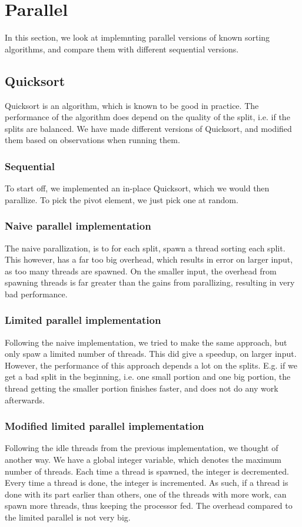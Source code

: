 \section{Parallel}
In this section, we look at implemnting parallel versions of known sorting
algorithms, and compare them with different sequential versions.

\subsection{Quicksort}
Quicksort is an algorithm, which is known to be good in practice. The
performance of the algorithm does depend on the quality of the split, i.e. if
the splits are balanced. We have made different versions of Quicksort, and
modified them based on observations when running them.

\subsubsection{Sequential}
To start off, we implemented an in-place Quicksort, which we would then
parallize. To pick the pivot element, we just pick one at random.

\subsubsection{Naive parallel implementation}
The naive parallization, is to for each split, spawn a thread sorting each
split. This however, has a far too big overhead, which results in error on
larger input, as too many threads are spawned. On the smaller input, the
overhead from spawning threads is far greater than the gains from parallizing,
resulting in very bad performance.

\subsubsection{Limited parallel implementation}
Following the naive implementation, we tried to make the same approach, but
only spaw a limited number of threads. This did give a speedup, on larger
input. However, the performance of this approach depends a lot on the splits.
E.g. if we get a bad split in the beginning, i.e. one small portion and one big
portion, the thread getting the smaller portion finishes faster, and does not
do any work afterwards.

\subsubsection{Modified limited parallel implementation}
Following the idle threads from the previous implementation, we thought of
another way. We have a global integer variable, which denotes the maximum
number of threads. Each time a thread is spawned, the integer is decremented.
Every time a thread is done, the integer is incremented. As such, if a thread
is done with its part earlier than others, one of the threads with more work,
can spawn more threads, thus keeping the processor fed. The overhead compared
to the limited parallel is not very big.

